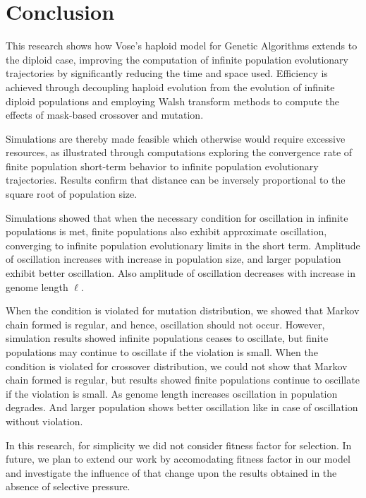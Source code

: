 \chapter{Conclusion}
This research shows how Vose's haploid model for Genetic Algorithms
extends to the diploid case, improving the computation of infinite
population evolutionary trajectories by significantly reducing the
time and space used.  Efficiency is achieved through decoupling
haploid evolution from the evolution of infinite diploid populations
and employing Walsh transform methods to compute the effects of
mask-based crossover and mutation.  

Simulations are thereby made feasible which otherwise would require
excessive resources, as illustrated through computations exploring 
the convergence rate of finite population short-term behavior to infinite population evolutionary trajectories. 
Results confirm that distance can be inversely proportional to the square root of population size.

Simulations showed that when the necessary condition for oscillation in infinite populations is met, 
finite populations also exhibit approximate oscillation, converging to 
infinite population evolutionary limits in the short term. Amplitude of oscillation increases with 
increase in population size, and larger population exhibit better oscillation. Also amplitude of 
oscillation decreases with increase in genome length $\ell$.

When the condition is violated for mutation distribution, we showed that Markov chain formed is 
regular, and hence, oscillation should not occur. However, simulation results showed 
infinite populations ceases to oscillate, but finite populations may continue to oscillate if the violation is small. 
When the condition is violated for crossover distribution, we could not show that Markov chain formed is regular, 
but results showed finite populations continue to oscillate if the violation is small. As genome length increases 
oscillation in population degrades. And larger population shows better oscillation 
like in case of oscillation without violation.

In this research, for simplicity we did not consider fitness factor for selection.  
In future, we plan to extend our work by accomodating fitness factor in our model and investigate 
the influence of that change upon the results obtained in the absence of selective pressure.



